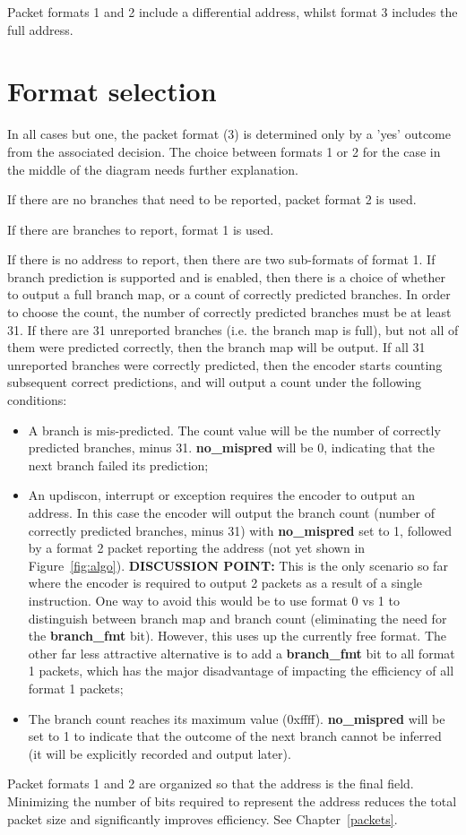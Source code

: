 Packet formats 1 and 2 include a differential address, whilst format 3 includes the full address.

\section{Format selection} \label{format-selection}

In all cases but one, the packet format (3) is determined only by a 'yes' outcome from the 
associated decision.  The choice between formats 1 or 2 for the case in the middle of the 
diagram needs further explanation.  

If there are no branches that need to be reported, packet format 2 is used.  

If there are branches to report, format 1 is used.

If there is no address to report, then there are two sub-formats of format 1.  If branch prediction
is supported and is enabled, then there is a choice of whether to output a full branch map, or a 
count of correctly predicted branches.  In order to choose the count, the number of correctly
predicted branches must be at least 31.  If there are 31 unreported branches (i.e. the branch
map is full), but not all of them were predicted correctly, then the branch map will be output.
If all 31 unreported branches were correctly predicted, then the encoder starts counting
subsequent correct predictions, and will output a count under the following conditions:

\begin{itemize}
  \item A branch is mis-predicted.  The count value will be the number of correctly predicted branches, 
    minus 31.  \textbf{no\_mispred} will be 0, indicating that the next branch failed its prediction;
  \item An updiscon, interrupt or exception requires the encoder to output an address.  In this case 
    the encoder will output the branch count (number of correctly predicted branches, minus 31) with 
    \textbf{no\_mispred} set to 1, followed by a format 2 packet reporting the address 
    (not yet shown in Figure~\ref{fig:algo}). 
    \textbf{DISCUSSION POINT:} This is the only scenario so far where the encoder is required to 
    output 2 packets as a result of a single instruction.  One way to avoid this would
    be to use format 0 vs 1 to distinguish between branch map and branch count (eliminating the need for
    the \textbf{branch\_fmt} bit).  However, this uses up the currently free format.  The other far less
    attractive alternative is to add a \textbf{branch\_fmt} bit to all format 1 packets, which has the 
    major disadvantage of impacting the efficiency of all format 1 packets;
  \item The branch count reaches its maximum value (0xffff).  \textbf{no\_mispred} will be set to 1 to
    indicate that the outcome of the next branch cannot be inferred (it will be explicitly recorded and
    output later).   
\end{itemize}

Packet formats 1 and 2 are organized so that the address is the final field.  Minimizing the 
number of bits required to represent the address reduces the total packet size and significantly
improves efficiency.  See Chapter~\ref{packets}.
